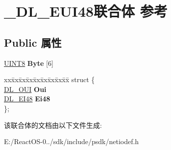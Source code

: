 \hypertarget{union___d_l___e_u_i48}{}\section{\+\_\+\+D\+L\+\_\+\+E\+U\+I48联合体 参考}
\label{union___d_l___e_u_i48}
\subsection*{Public 属性}
\begin{DoxyCompactItemize}
\item 
\mbox{\label{union___d_l___e_u_i48_a53c613ea3890f505d7def9b5addc3f41}} 
\hyperlink{_processor_bind_8h_ab27e9918b538ce9d8ca692479b375b6a}{U\+I\+N\+T8} {\bfseries Byte} \mbox{[}6\mbox{]}
\item 
\mbox{\label{union___d_l___e_u_i48_a0f9bb0bdbdf860d82dd9fe03bb9b3529}} 
\begin{tabbing}
xx\=xx\=xx\=xx\=xx\=xx\=xx\=xx\=xx\=\kill
struct \{\\
\>\hyperlink{union___d_l___o_u_i}{DL\_OUI} {\bfseries Oui}\\
\>\hyperlink{union___d_l___e_i48}{DL\_EI48} {\bfseries Ei48}\\
\}; \\

\end{tabbing}\end{DoxyCompactItemize}


该联合体的文档由以下文件生成\+:\begin{DoxyCompactItemize}
\item 
E\+:/\+React\+O\+S-\/0../sdk/include/psdk/netiodef.\+h\end{DoxyCompactItemize}
